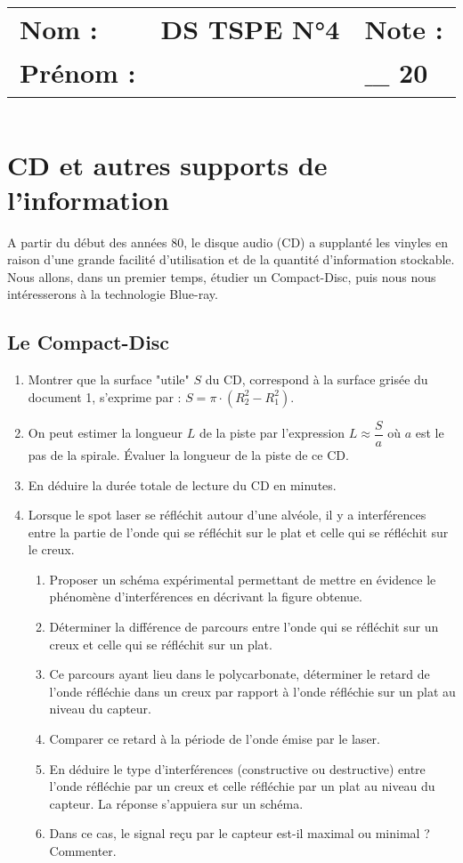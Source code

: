\documentclass[a4paper,11pt,fleqn]{article}%
\title{\vspace{-1cm}\large 
	\begin{tabular}{|m{5cm}|>{\centering}m{8cm}|>{\centering\arraybackslash}m{4cm}|}
		\hline
		Nom : & \textbf{\textsc{DS TSPE N°4}} &  Note : \\
		Prénom : & & $\_\_\_$ \textbf{20} \\ \hline
\end{tabular}}
\date{}
\begin{document}
\maketitle
\vspace{-2.5cm}
\section{CD et autres supports de l'information}
A partir du début des années 80, le disque audio (CD) a supplanté les vinyles en raison d'une grande facilité d'utilisation et de la quantité d'information stockable. Nous allons, dans un premier temps, étudier un Compact-Disc, puis nous nous intéresserons à la technologie Blue-ray.
\subsection{Le Compact-Disc}
	\begin{enumerate}
		\item Montrer que la surface "utile" $S$ du CD, correspond à la surface grisée du document 1, s'exprime par : $S=\pi \cdot (R_2^2 - R_1^2)$.
		\item On peut estimer la longueur $L$ de la piste par l'expression $L \approx \dfrac{S}{a}$ où $a$ est le pas de la spirale. Évaluer la longueur de la piste de ce CD.
		\item En déduire la durée totale de lecture du CD en minutes.
		\item Lorsque le spot laser se réfléchit autour d'une alvéole, il y a interférences entre la partie de l'onde qui se réfléchit sur le plat et celle qui se réfléchit sur le creux.
		\begin{enumerate}[label=\theenumi.\arabic*]
			\item Proposer un schéma expérimental permettant de mettre en évidence le phénomène d'interférences en décrivant la figure obtenue.
			\item Déterminer la différence de parcours entre l'onde qui se réfléchit sur un creux et celle qui se réfléchit sur un plat.
			\item Ce parcours ayant lieu dans le polycarbonate, déterminer le retard de l'onde réfléchie dans un creux par rapport à l'onde réfléchie sur un plat au niveau du capteur.
			\item Comparer ce retard à la période de l'onde émise par le laser.
			\item En déduire le type d'interférences (constructive ou destructive) entre l'onde réfléchie par un creux et celle réfléchie par un plat au niveau du capteur. La réponse s'appuiera sur un schéma.
			\item Dans ce cas, le signal reçu par le capteur est-il maximal ou minimal ? Commenter. 
		\end{enumerate}
		
	\end{enumerate}
\end{document}
